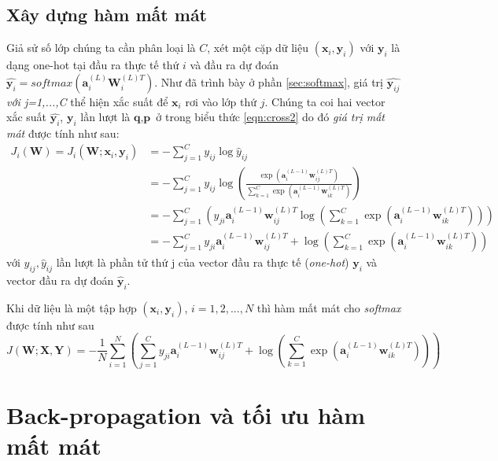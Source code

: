 \subsection{Xây dựng hàm mất mát}
Giả sử số lớp chúng ta cần phân loại là $C$, xét một cặp dữ liệu $(\textbf{x}_i,\textbf{y}_i)$ với $\textbf{y}_i$ là dạng one-hot tại đầu ra thực tế thứ $i$ và đầu ra dự đoán $\widehat{\textbf{y}_i} = softmax(\textbf{a}^{(L)}_i\textbf{W}^{(L)T}_i)$. Như đã trình bày ở phần \ref{sec:softmax}, giá trị $\widehat{\textbf{y}_{ij}}$\textit{ với j=1,...,C} thể hiện xắc suất để $\textbf{x}_i$ rơi vào lớp thứ $j$. Chúng ta coi  hai vector xắc suất $\widehat{\textbf{y}_{i}}$, $\textbf{y}_i$ lần lượt là $\textbf{q},\textbf{p}$ ở trong biểu thức \ref{eqn:cross2} do đó \textit{giá trị mất mát} được tính như sau:
\begin{equation}
\label{eq:cost1}
\begin{split}
J_i(\textbf{W}) = J_i(\textbf{W};\textbf{x}_i,\textbf{y}_i) &=-\sum_{j=1}^C y_{ij} \log \widehat{y}_{ij}	\\
&= -\sum_{j = 1}^C y_{ij}\log\left(\frac{\exp(\textbf{a}^{(L-1)}_i\textbf{w}^{(L)T}_{ij})}{\sum_{k=1}^C \exp(\textbf{a}^{(L-1)}_{i}\textbf{w}^{(L)T}_{ik})}\right)\\
&= -\sum_{j=1}^C\left(y_{ji} \textbf{a}^{(L-1)}_i\textbf{w}^{(L)T}_{ij}\log\left(\sum_{k=1}^C \exp(\textbf{a}^{(L-1)}_i\textbf{w}^{(L)T}_{ik})\right)\right) \\
&= -\sum_{j=1}^C y_{ji} \textbf{a}^{(L-1)}_i\textbf{w}^{(L)T}_{ij} + \log\left(\sum_{k=1}^C \exp(\textbf{a}^{(L-1)}_i\textbf{w}^{(L)T}_{ik})\right) 
\end{split}
\end{equation}
với  $y_{ij}, \widehat{y}_{ij}$ lần lượt là phần tử thứ j của vector đầu ra thực tế (\textit{one-hot}) $\textbf{y}_i$ và vector đầu ra dự đoán $\widehat{\textbf{y}}_i$. \par

Khi dữ liệu là một tập hợp $(\textbf{x}_i,\textbf{y}_i)$, $i=1,2,...,N$ thì hàm mất mát cho \textit{softmax} được tính như sau
\begin{equation}
\label{eq:cost2}
J(\textbf{W};\textbf{X},\textbf{Y}) = -\frac{1}{N} \sum_{i=1}^N \left(  \sum_{j=1}^C y_{ji} \textbf{a}^{(L-1)}_i\textbf{w}^{(L)T}_{ij} + \log\left(\sum_{k=1}^C \exp(\textbf{a}^{(L-1)}_i\textbf{w}^{(L)T}_{ik})\right) \right)
\end{equation} 


\section{Back-propagation và tối ưu hàm mất mát}
